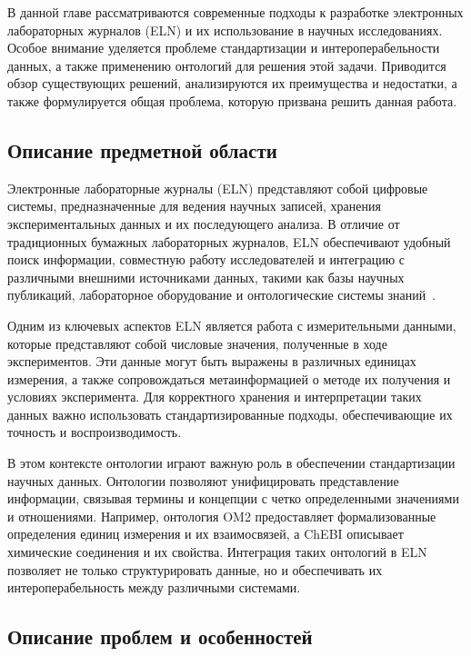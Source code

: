 \setcounter{section}{1}

В данной главе рассматриваются современные подходы к разработке электронных лабораторных журналов (ELN) и их использование в научных исследованиях.
Особое внимание уделяется проблеме стандартизации и интероперабельности данных, а также применению онтологий для решения этой задачи.
Приводится обзор существующих решений, анализируются их преимущества и недостатки, а также формулируется общая проблема, которую призвана решить данная работа.

\subsection{Описание предметной области}

Электронные лабораторные журналы (ELN) представляют собой цифровые системы, предназначенные для ведения научных записей, хранения экспериментальных данных и их последующего анализа.
В отличие от традиционных бумажных лабораторных журналов, ELN обеспечивают удобный поиск информации, совместную работу исследователей и интеграцию с различными внешними источниками данных, такими как базы научных публикаций, лабораторное оборудование и онтологические системы знаний~\cite{ontology:base2}.

Одним из ключевых аспектов ELN является работа с измерительными данными, которые представляют собой числовые значения, полученные в ходе экспериментов.
Эти данные могут быть выражены в различных единицах измерения, а также сопровождаться метаинформацией о методе их получения и условиях эксперимента.
Для корректного хранения и интерпретации таких данных важно использовать стандартизированные подходы, обеспечивающие их точность и воспроизводимость.

В этом контексте онтологии играют важную роль в обеспечении стандартизации научных данных.
Онтологии позволяют унифицировать представление информации, связывая термины и концепции с четко определенными значениями и отношениями.
Например, онтология OM2 предоставляет формализованные определения единиц измерения и их взаимосвязей, а ChEBI описывает химические соединения и их свойства.
Интеграция таких онтологий в ELN позволяет не только структурировать данные, но и обеспечивать их интероперабельность между различными системами.

\subsection{Описание проблем и особенностей}

